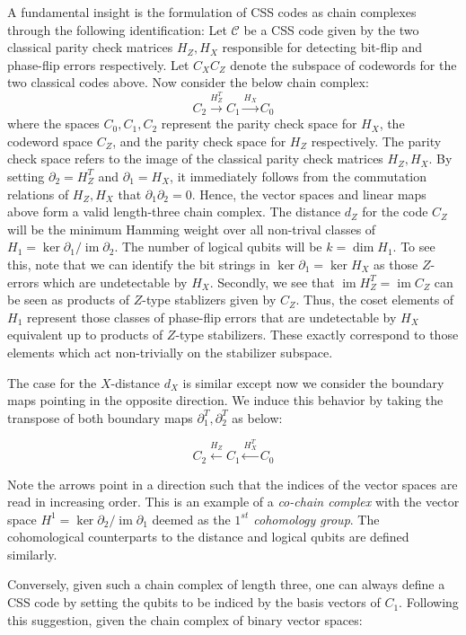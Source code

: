 \documentclass[12pt]{article}%
\DeclareMathOperator{\im}{im}
\theoremstyle{definition}
\begin{document}
A fundamental insight is the formulation of CSS codes as chain complexes through the following identification: Let $\mathcal{C}$ be a CSS code given by the two classical parity check matrices $H_Z, H_X$ responsible for detecting bit-flip and phase-flip errors respectively. Let $C_XC_Z$ denote the subspace of codewords for the two classical codes above. Now consider the below chain complex:
%
\[ C_2 \xrightarrow{H_Z^{T}} C_1 \xrightarrow{H_X} C_0 \]
%
where the spaces $C_0,C_1,C_2$ represent the parity check space for $H_X$, the codeword space $C_Z$, and the parity check space for $H_Z$ respectively. The parity check space refers to the image of the classical parity check matrices $H_Z,H_X$. By setting $\partial_2 = H_Z^{T}$ and $\partial_1 = H_X$, it immediately follows from the commutation relations of $H_Z,H_X$ that $\partial_1\partial_2 = 0$. Hence, the vector spaces and linear maps above form a valid length-three chain complex. The distance $d_Z$ for the code $C_Z$ will be the minimum Hamming weight over all non-trival classes of  $H_1 = \ker \partial_1  / \im \partial_2$. The number of logical qubits will be $k = \dim{H_1}$. To see this, note that we can identify the bit strings in $\ker \partial_1 = \ker H_X$ as those $Z$-errors which are undetectable by $H_X$. Secondly, we see that $\im H_Z^T = \im C_Z$ can be seen as products of $Z$-type stablizers given by $C_Z$. Thus, the coset elements of $H_1$ represent those classes of phase-flip errors that are undetectable by $H_X$  equivalent up to products of $Z$-type stabilizers. These exactly correspond to those elements which act non-trivially on the stabilizer subspace. 

The case for the $X$-distance $d_X$ is similar except now we consider the boundary maps pointing in the opposite direction. We induce this behavior by taking the transpose of both boundary maps $\partial_1^T, \partial_2^T$ as below:

\[ C_2 \xleftarrow{H_Z} C_1 \xleftarrow{H_X^T} C_0  \]

\noindent Note the arrows point in a direction such that the indices of the vector spaces are read in increasing order. This is an example of a \emph{co-chain complex} with the vector space $H^1 = \ker \partial_2 / \im \partial_1$ deemed as the \emph{$1^{st}$ cohomology group}. The cohomological counterparts to the distance and logical qubits are defined similarly.

\noindent Conversely, given such a chain complex of length three, one can always define a CSS code by setting the qubits to be indiced by the basis vectors of $C_1$. Following this suggestion, given the chain complex of binary vector spaces:
\end{document}

